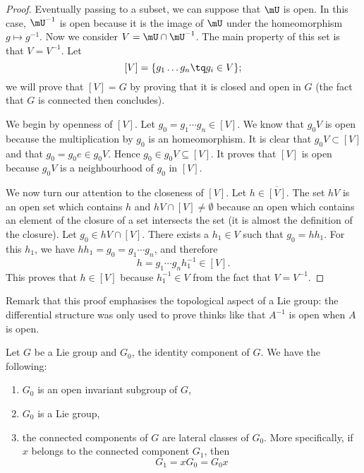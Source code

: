 \begin{proof}
	Eventually passing to a subset, we can suppose that $\mU$ is open. In this case, $\mU^{-1}$ is open because it is the image of $\mU$ under the homeomorphism $g\mapsto g^{-1}$. Now we consider $V=\mU\cap\mU^{-1}$. The main property of this set is that $V=V^{-1}$. Let
	\[
		[V]=\{ g_1\ldots g_n\tq g_{i}\in V \};
	\]
	we will prove that $[V]=G$ by proving that it is closed and open in $G$ (the fact that $G$ is connected then concludes).

	We begin by openness of $[V]$. Let $g_0=g_1\cdots g_n\in[V]$. We know that $g_0V$ is open because the multiplication by $g_0$ is an homeomorphism. It is clear that $g_0V\subset [V]$ and that $g_0=g_0e\in g_0V$. Hence $g_0\in g_0V\subseteq[V]$. It proves that $[V]$ is open because $g_0V$ is a neighbourhood of $g_0$ in $[V]$.

	We now turn our attention to the closeness of $[V]$. Let $h\in\overline{ [V] }$. The set $hV$ is an open set which contains $h$ and $hV\cap [V]\neq \emptyset$ because an open which contains an element of the closure of a set intersects the set (it is almost the definition of the closure). Let $g_0\in hV\cap[V]$. There exists a $h_{1}\in V$ such that $g_0=hh_1$. For this $h_1$, we have $hh_1=g_0=g_1\cdots g_n$, and therefore
	\[
		h=g_1\cdots g_n h_1^{-1}\in[V].
	\]
	This proves that $h\in[V]$ because $h_1^{-1}\in V$ from the fact that $V=V^{-1}$.
\end{proof}
Remark that this proof emphasises the topological aspect of a Lie group: the differential structure was only used to prove thinks like that $A^{-1}$ is open when $A$ is open.

\begin{proposition}		\label{PROPooWNJXooXhqKKv}
	Let $G$ be a Lie group and $G_0$, the identity component of $G$. We have the following:
	\begin{enumerate}
		\item $G_0$ is an open invariant subgroup of $G$,
		\item $G_0$ is a Lie group,
		\item the connected components of $G$ are lateral classes of $G_0$. More specifically, if $x$ belongs to the connected component $G_1$, then
		      \begin{equation}		\label{EQooKCPVooBBOcgT}
			      G_1=xG_0=G_0x
		      \end{equation}
	\end{enumerate}

\end{proposition}

